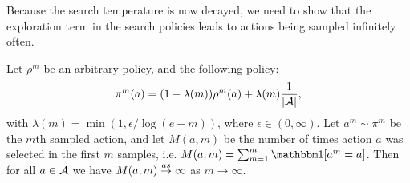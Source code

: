         Because the search temperature is now decayed, we need to show that the exploration term in the search policies leads to actions being sampled infinitely often.



        \begin{lemma} \label{lem:inf_often_action_select}
            Let $\rho^m$ be an arbitrary policy, and the following policy: 
            \begin{align} 
                \pi^m(a)=(1-\lambda(m))\rho^m(a) + \lambda(m) \frac{1}{|\mathcal{A}|}, \label{appeq:ioas_policy}
            \end{align} 
            with $\lambda(m)=\min(1,\epsilon/\log(e+m))$, where $\epsilon\in(0,\infty)$. Let $a^m\sim \pi^m$ be the $m$th sampled action, and let $M(a,m)$ be the number of times action $a$ was selected in the first $m$ samples, i.e. $M(a,m)=\sum_{m=1}^m \one[a^m=a]$. Then for all $a\in\mathcal{A}$ we have $M(a,m)\overset{as}{\to}\infty$ as $m\rightarrow \infty$.
        \end{lemma}
